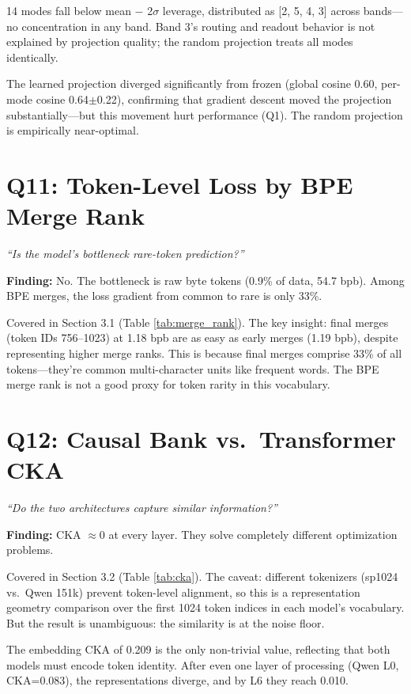 \documentclass[11pt,a4paper]{report}
\newcommand{\cq}[1]{\textcolor{q}{\textit{``#1''}}}
\newcommand{\finding}[1]{\textcolor{finding}{\textbf{Finding:}} #1}
\begin{document}
14 modes fall below mean $-$ 2$\sigma$ leverage, distributed as [2, 5, 4, 3] across bands---no concentration in any band. Band 3's routing and readout behavior is not explained by projection quality; the random projection treats all modes identically.

The learned projection diverged significantly from frozen (global cosine 0.60, per-mode cosine 0.64$\pm$0.22), confirming that gradient descent moved the projection substantially---but this movement hurt performance (Q1). The random projection is empirically near-optimal.


\section{Q11: Token-Level Loss by BPE Merge Rank}

\cq{Is the model's bottleneck rare-token prediction?}

\finding{No. The bottleneck is raw byte tokens (0.9\% of data, 54.7 bpb). Among BPE merges, the loss gradient from common to rare is only 33\%.}

Covered in Section 3.1 (Table \ref{tab:merge_rank}). The key insight: final merges (token IDs 756--1023) at 1.18 bpb are as easy as early merges (1.19 bpb), despite representing higher merge ranks. This is because final merges comprise 33\% of all tokens---they're common multi-character units like frequent words. The BPE merge rank is not a good proxy for token rarity in this vocabulary.


\section{Q12: Causal Bank vs.\ Transformer CKA}

\cq{Do the two architectures capture similar information?}

\finding{CKA $\approx 0$ at every layer. They solve completely different optimization problems.}

Covered in Section 3.2 (Table \ref{tab:cka}). The caveat: different tokenizers (sp1024 vs.\ Qwen 151k) prevent token-level alignment, so this is a representation geometry comparison over the first 1024 token indices in each model's vocabulary. But the result is unambiguous: the similarity is at the noise floor.

The embedding CKA of 0.209 is the only non-trivial value, reflecting that both models must encode token identity. After even one layer of processing (Qwen L0, CKA=0.083), the representations diverge, and by L6 they reach 0.010.
\end{document}
